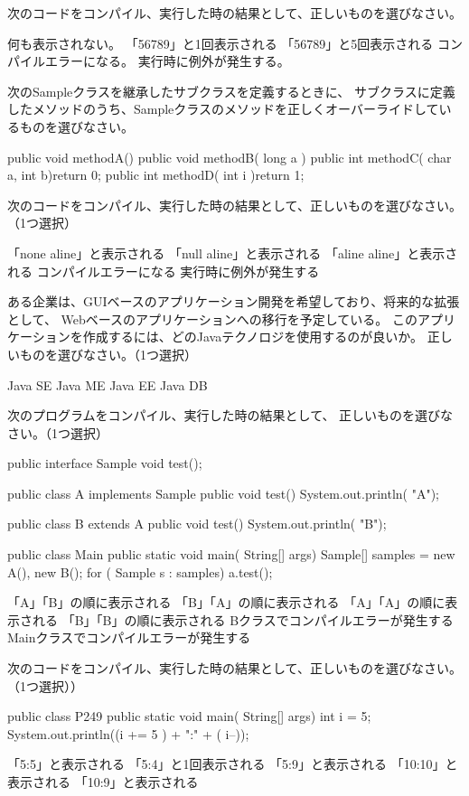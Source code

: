 \documentclass[12pt]{article}
\begin{document}
次のコードをコンパイル、実行した時の結果として、正しいものを選びなさい。


何も表示されない。
「56789」と1回表示される
「56789」と5回表示される
コンパイルエラーになる。
実行時に例外が発生する。

次のSampleクラスを継承したサブクラスを定義するときに、
サブクラスに定義したメソッドのうち、Sampleクラスのメソッドを正しくオーバーライドしているものを選びなさい。


public void  methodA(){}
public  void methodB( long a ){}
public int methodC( char a, int b){return 0;}
public int methodD( int i ){return 1;}

次のコードをコンパイル、実行した時の結果として、正しいものを選びなさい。（1つ選択）

「none aline」と表示される
「null aline」と表示される
「aline aline」と表示される
コンパイルエラーになる
実行時に例外が発生する

ある企業は、GUIベースのアプリケーション開発を希望しており、将来的な拡張として、
Webベースのアプリケーションへの移行を予定している。
このアプリケーションを作成するには、どのJavaテクノロジを使用するのが良いか。
正しいものを選びなさい。（1つ選択）

Java SE
Java ME
Java EE
Java DB

次のプログラムをコンパイル、実行した時の結果として、
正しいものを選びなさい。（1つ選択）

public interface Sample {
    void test();
}

public class A implements Sample{
    public void test(){
        System.out.println( "A");
    }
}

public class B extends A {
    public void test(){
        System.out.println( "B");
    }
}

public class Main{
    public  static void main( String[] args){
        Sample[] samples = { new A(), new B()};
        for ( Sample s : samples){
            a.test();
        }
    }
}


「A」「B」の順に表示される
「B」「A」の順に表示される
「A」「A」の順に表示される
「B」「B」の順に表示される
Bクラスでコンパイルエラーが発生する
Mainクラスでコンパイルエラーが発生する

次のコードをコンパイル、実行した時の結果として、正しいものを選びなさい。（1つ選択））

public  class P249 {
    public  static void main( String[] args){
        int i = 5;
        System.out.println((i += 5 ) + ":" + ( i--));
    }
}

「5:5」と表示される
「5:4」と1回表示される
「5:9」と表示される
「10:10」と表示される
「10:9」と表示される
\end{document}
